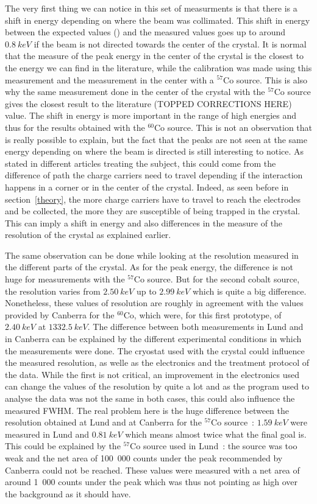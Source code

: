 \documentclass[11pt,a4paper]{article}
\begin{document}
The very first thing we can notice in this set of measurments is that there is a shift in energy depending on where the beam was collimated. This shift in energy between the expected values (\cite{lit}) and the measured values goes up to around $0.8~keV$ if the beam is not directed towards the center of the crystal. It is normal that the measure of the peak energy in the center of the crystal is the closest to the energy we can find in the literature, while the calibration was made using this measurement and the measurement in the center with a $^{57}$Co source. This is also why the same measurement done in the center of the crystal with the $^{57}$Co source gives the closest result to the literature (TOPPED CORRECTIONS HERE) value. The shift in energy is more important in the range of high energies and thus for the results obtained with the $^{60}$Co source. This is not an observation that is really possible to explain, but the fact that the peaks are not seen at the same energy depending on where the beam is directed is still interesting to notice. As stated in different articles treating the subject, this could come from the difference of path the charge carriers need to travel depending if the interaction happens in a corner or in the center of the crystal. Indeed, as seen before in section~\ref{theory}, the more charge carriers have to travel to reach the electrodes and be collected, the more they are susceptible of being trapped in the crystal. This can imply a shift in energy and also differences in the measure of the resolution of the crystal as explained earlier.

The same observation can be done while looking at the resolution measured in the different parts of the crystal. As for the peak energy, the difference is not huge for measurements with the $^{57}$Co source. But for the second cobalt source, the resolution varies from $2.50~keV$ up to $2.99~keV$ which is quite a big difference. Nonetheless, these values of resolution are roughly in agreement with the values provided by Canberra for the $^{60}$Co, which were, for this first prototype, of $2.40~keV$ at $1332.5~keV$. The difference between both measurements in Lund and in Canberra can be explained by the different experimental conditions in which the measurements were done. The cryostat used with the crystal could influence the measured resolution, as welle as the electronics and the treatment protocol of the data. While the first is not critical, an improvement in the electronics used can change the values of the resolution by quite a lot and as the program used to analyse the data was not the same in both cases, this could also influence the measured FWHM. The real problem here is the huge difference between the resolution obtained at Lund and at Canberra for the $^{57}$Co source~: $1.59~keV$ were measured in Lund and $0.81~keV$ which means almost twice what the final goal is. This could be explained by the $^{57}$Co source used in Lund~: the source was too weak and the net area of 100~000 counts under the peak recommended by Canberra could not be reached. These values were measured with a net area of around 1~000 counts under the peak which was thus not pointing as high over the background as it should have.
\end{document}
